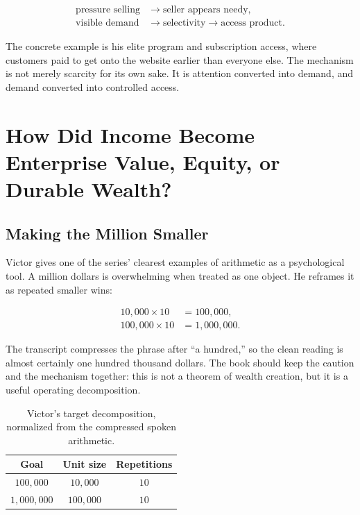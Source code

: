 \documentclass[11pt,oneside]{book}
\begin{document}
\begin{align}
\text{pressure selling} &\longrightarrow \text{seller appears needy},\\
\text{visible demand} &\longrightarrow \text{selectivity}
                       \longrightarrow \text{access product}.
\end{align}

The concrete example is his elite program and subscription access, where customers paid to get onto the website earlier than everyone else. The mechanism is not merely scarcity for its own sake. It is attention converted into demand, and demand converted into controlled access.

\chapter{How Did Income Become Enterprise Value, Equity, or Durable Wealth?}

\section{Making the Million Smaller}

Victor gives one of the series' clearest examples of arithmetic as a psychological tool. A million dollars is overwhelming when treated as one object. He reframes it as repeated smaller wins:

\begin{align}
10{,}000 \times 10 &= 100{,}000,\\
100{,}000 \times 10 &= 1{,}000{,}000.
\end{align}

The transcript compresses the phrase after ``a hundred,'' so the clean reading is almost certainly one hundred thousand dollars. The book should keep the caution and the mechanism together: this is not a theorem of wealth creation, but it is a useful operating decomposition.

\begin{table}[h]
\centering
\begin{tabular}{c|c|c}
Goal & Unit size & Repetitions \\
\hline
\(100{,}000\) & \(10{,}000\) & \(10\) \\
\(1{,}000{,}000\) & \(100{,}000\) & \(10\) \\
\end{tabular}
\caption{Victor's target decomposition, normalized from the compressed spoken arithmetic.}
\end{table}
\end{document}
